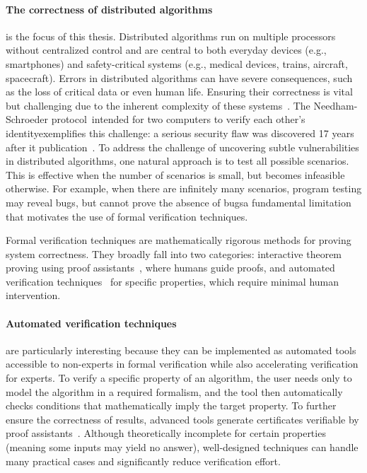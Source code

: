 
\paragraph{The correctness of distributed algorithms} is the focus of this thesis. 
Distributed algorithms run on multiple processors without centralized control and are central to both everyday devices (e.g., smartphones) and safety-critical systems (e.g., medical devices, trains, aircraft, spacecraft).
Errors in distributed algorithms can have severe consequences, such as the loss of critical data or even human life. Ensuring their correctness is vital but challenging due to the inherent complexity of these systems~\cite{heiser2010theroad, lamport2019thebyzantine}. 
The Needham-Schroeder protocol~\cite{needham1978using}\textemdash intended for two computers to verify each other's identity\textemdash exemplifies this challenge: a serious security flaw was discovered 17 years after it publication~\cite{lowe1996breaking}.
To address the challenge of uncovering subtle vulnerabilities in distributed algorithms, one natural approach is to test all possible scenarios. This is effective when the number of scenarios is small, but becomes infeasible otherwise. For example, when there are infinitely many scenarios, program testing may reveal bugs, but cannot prove the absence of bugs\textemdash a fundamental limitation that motivates the use of formal verification techniques.

Formal verification techniques are mathematically rigorous methods for proving system correctness. They broadly fall into two categories: interactive theorem proving using proof assistants~\cite{moura2021lean4, bertot2004coq,nipkow2002isabelle}, where humans guide proofs, and automated verification techniques~\cite{clarke2018model, contejean2011automated, cortier2014formal} for specific properties, which require minimal human intervention.

\paragraph{Automated verification techniques} are particularly interesting because they can be implemented as automated tools accessible to non-experts in formal verification while also accelerating verification for experts.
To verify a specific property of an algorithm, the user needs only to model the algorithm in a required formalism, and the tool then automatically checks conditions that mathematically imply the target property. To further ensure the correctness of results, advanced tools generate certificates verifiable by proof assistants~\cite{contejean2011automated}. 
Although theoretically incomplete for certain properties (meaning some inputs may yield no answer), well-designed techniques can handle many practical cases and significantly reduce verification effort.

